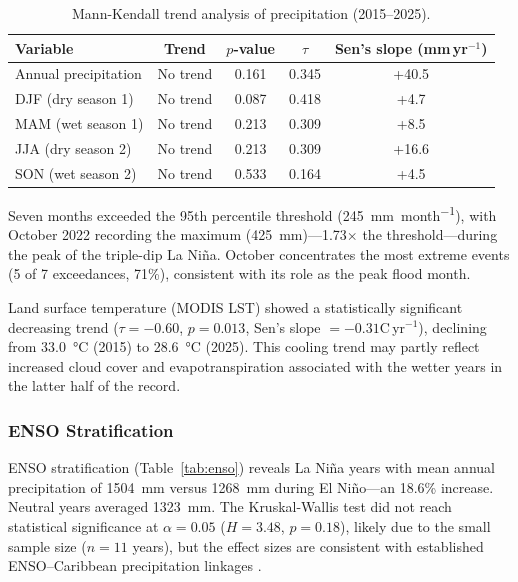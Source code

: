 \documentclass{article}
\begin{document}
\begin{table}[htbp]
\caption{Mann-Kendall trend analysis of precipitation (2015--2025).}
\label{tab:precip_trends}
\centering
\footnotesize
\begin{tabular}{lcccc}
\toprule
\textbf{Variable} & \textbf{Trend} & \textbf{$p$-value} & \textbf{$\tau$} & \textbf{Sen's slope (mm\,yr$^{-1}$)} \\
\midrule
Annual precipitation & No trend & 0.161 & 0.345 & +40.5 \\
DJF (dry season 1) & No trend & 0.087 & 0.418 & +4.7 \\
MAM (wet season 1) & No trend & 0.213 & 0.309 & +8.5 \\
JJA (dry season 2) & No trend & 0.213 & 0.309 & +16.6 \\
SON (wet season 2) & No trend & 0.533 & 0.164 & +4.5 \\
\bottomrule
\end{tabular}
\end{table}

Seven months exceeded the 95th percentile threshold (\SI{245}{\milli\metre\per month}), with October 2022 recording the maximum (\SI{425}{\milli\metre})---1.73$\times$ the threshold---during the peak of the triple-dip La Ni\~na. October concentrates the most extreme events (5 of 7 exceedances, 71\%), consistent with its role as the peak flood month.

Land surface temperature (MODIS LST) showed a statistically significant decreasing trend ($\tau = -0.60$, $p = 0.013$, Sen's slope $= -0.31$\textdegree{}C\,yr$^{-1}$), declining from \SI{33.0}{\degreeCelsius} (2015) to \SI{28.6}{\degreeCelsius} (2025). This cooling trend may partly reflect increased cloud cover and evapotranspiration associated with the wetter years in the latter half of the record.

\subsubsection{ENSO Stratification}

ENSO stratification (Table~\ref{tab:enso}) reveals La Ni\~na years with mean annual precipitation of \SI{1504}{\milli\metre} versus \SI{1268}{\milli\metre} during El Ni\~no---an 18.6\% increase. Neutral years averaged \SI{1323}{\milli\metre}. The Kruskal-Wallis test did not reach statistical significance at $\alpha = 0.05$ ($H = 3.48$, $p = 0.18$), likely due to the small sample size ($n = 11$ years), but the effect sizes are consistent with established ENSO--Caribbean precipitation linkages \citep{Poveda2001, Poveda2011}.
\end{document}
